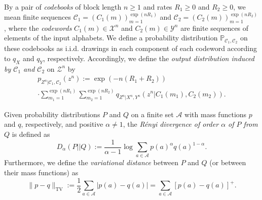 \documentclass[journal]{IEEEtran}
\newcommand{\channelpmf}{q}
\newcommand{\codebookpmf}{p}
\newcommand{\generalrvOneValue}{a}
\newcommand{\generalrvOneAlph}{\mathcal{A}}
\newcommand{\generalpdistOne}{P}
\newcommand{\generalpmfOne}{p}
\newcommand{\generalpdistTwo}{Q}
\newcommand{\generalpmfTwo}{q}
\newcommand{\codebookRateOne}{R_1}
\newcommand{\codebookRateTwo}{R_2}
\newcommand{\channelInOne}{X}
\newcommand{\channelInOneAlph}{\mathcal{X}}
\newcommand{\channelInTwo}{Y}
\newcommand{\channelInTwoAlph}{\mathcal{Y}}
\newcommand{\channelOut}{Z}
\newcommand{\channelOutAlph}{\mathcal{Z}}
\newcommand{\channelOutAlphElement}{z}
\newcommand{\codebookOne}{\mathcal{C}_1}
\newcommand{\codebookTwo}{\mathcal{C}_2}
\newcommand{\codebookOneWord}[1]{C_1(#1)}
\newcommand{\codebookTwoWord}[1]{C_2(#1)}
\newcommand{\codewordIndex}{m}
\newcommand{\codebookBlocklength}{n}
\newcommand{\totalvariation}[1]{\lVert #1 \rVert_\mathrm{TV}}
\newcommand{\absolute}[1]{\left\lvert #1 \right\rvert}
\newcommand{\positive}[1]{\left[ #1 \right]^+}
\newcommand{\renyiParam}{\alpha}
\newcommand{\renyidiv}[3]{D_{#1}\left({#2} || {#3}\right)}
\newcommand{\Probability}{\mathbb{P}}
\begin{document}
By a pair of \emph{codebooks} of block length $\codebookBlocklength \geq 1$ and rates $\codebookRateOne \geq 0$ and $\codebookRateTwo \geq 0$, we mean finite sequences
$\codebookOne = (\codebookOneWord{\codewordIndex})_{\codewordIndex = 1}^{\exp(\codebookBlocklength\codebookRateOne)}$
and
$\codebookTwo = (\codebookTwoWord{\codewordIndex})_{\codewordIndex = 1}^{\exp(\codebookBlocklength\codebookRateTwo)}$,
where the \emph{codewords} $\codebookOneWord{\codewordIndex} \in \channelInOneAlph^\codebookBlocklength$ and $\codebookTwoWord{\codewordIndex} \in \channelInTwoAlph^\codebookBlocklength$ are finite sequences of elements of the input alphabets. We define a probability distribution $\Probability_{\codebookOne, \codebookTwo}$ on these codebooks as i.i.d. drawings in each component of each codeword according to $\channelpmf_\channelInOne$ and $\channelpmf_\channelInTwo$, respectively. Accordingly, we define the \emph{output distribution induced by $\codebookOne$ and $\codebookTwo$} on $\channelOutAlph^\codebookBlocklength$ by
\begin{multline*}
\codebookpmf_{\channelOut^\codebookBlocklength | \codebookOne, \codebookTwo}(\channelOutAlphElement^\codebookBlocklength) :=
  \exp(-\codebookBlocklength(\codebookRateOne+\codebookRateTwo))
  \\ \cdot
  \sum\limits_{\codewordIndex_1=1}^{\exp(\codebookBlocklength\codebookRateOne)}
  \sum\limits_{\codewordIndex_2=1}^{\exp(\codebookBlocklength\codebookRateTwo)}
      \channelpmf_{\channelOut^\codebookBlocklength | \channelInOne^\codebookBlocklength, \channelInTwo^\codebookBlocklength}(\channelOutAlphElement^\codebookBlocklength | \codebookOneWord{\codewordIndex_1}, \codebookTwoWord{\codewordIndex_2}).
\end{multline*}

Given probability distributions $\generalpdistOne$ and $\generalpdistTwo$ on a finite set $\generalrvOneAlph$ with mass functions $\generalpmfOne$ and $\generalpmfTwo$, respectively, and positive $\renyiParam \neq 1$, the \emph{Rényi divergence of order $\renyiParam$ of $\generalpdistOne$ from $\generalpdistTwo$} is defined as
\[
\renyidiv{\renyiParam}{\generalpdistOne}{\generalpdistTwo}
:=
\frac{1}{\renyiParam-1}
\log
\sum\limits_{\generalrvOneValue \in \generalrvOneAlph}
  \generalpmfOne(\generalrvOneValue)^\renyiParam
  \generalpmfTwo(\generalrvOneValue)^{1-\renyiParam}.
\]
Furthermore, we define the \emph{variational distance} between $\generalpdistOne$ and $\generalpdistTwo$ (or between their mass functions) as
\[
\totalvariation{\generalpmfOne - \generalpmfTwo}
:=
\frac{1}{2} \sum\limits_{\generalrvOneValue \in \generalrvOneAlph} \absolute{\generalpmfOne(\generalrvOneValue) - \generalpmfTwo(\generalrvOneValue)}
=
\sum\limits_{\generalrvOneValue \in \generalrvOneAlph} \positive{\generalpmfOne(\generalrvOneValue) - \generalpmfTwo(\generalrvOneValue)}.
\]
\end{document}
